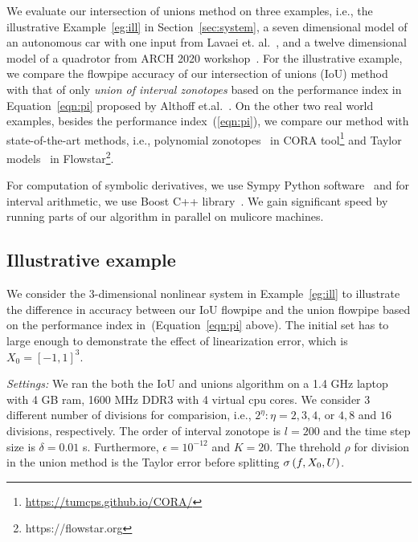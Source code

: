 We evaluate our intersection of unions method on three examples, i.e.,
the illustrative Example~\ref{eg:ill} in Section~\ref{sec:system}, a
seven dimensional model of an autonomous car with one input from Lavaei
et. al.~\cite{lavaei2020formal}, and a twelve dimensional model of a quadrotor
from ARCH 2020 workshop~\cite{geretti2020arch}.  For the illustrative
example, we compare the flowpipe accuracy of our intersection of
unions (IoU) method with that of only
\emph{union of interval zonotopes} based on the performance index in
Equation~\ref{eqn:pi} proposed by Althoff
et.al.~\cite{althoff2008reachability}.  
On the other two real world
examples, besides the performance index~(\ref{eqn:pi}), we compare our
method with state-of-the-art methods, i.e., polynomial
zonotopes~\cite{althoff2013reachability} in CORA
tool\footnote{\url{https://tumcps.github.io/CORA/}} and Taylor
models~\cite{chen2012taylor} in
Flowstar\footnote{https://flowstar.org}.


For computation of symbolic derivatives, we use Sympy Python
software~\cite{10.7717/peerj-cs.103} and for interval arithmetic, we
use Boost C++ library~\cite{bronnimann2006design}.  We gain
significant speed by running parts of our algorithm in
parallel on mulicore machines.

\subsection{Illustrative example}
We consider the 3-dimensional nonlinear system in Example~\ref{eg:ill}
to illustrate the difference in accuracy between our IoU flowpipe and
the union flowpipe based on the performance index
in~\cite{althoff2008reachability}(Equation~\ref{eqn:pi} above).  The
initial set has to large enough to demonstrate the effect of
linearization error, which is $X_0 = [-1,1]^3$.

\emph{Settings:}  We ran the both the IoU and unions algorithm on a 1.4 GHz
laptop with 4 GB ram, 1600 MHz DDR3 with 4 virtual cpu cores.  We
consider 3 different number of divisions for comparision, i.e.,
$2^\eta:\eta = 2, 3,4$, or $4, 8$ and $16$ divisions,
respectively. The order of interval zonotope is $l = 200$ and the time
step size is $\delta = 0.01$ s.  Furthermore, $\epsilon = 10^{-12}$
and $K = 20$.  The threhold $\rho$ for division in the union method is
the Taylor error before splitting $\sigma\left(f,X_0,U\right)$.

